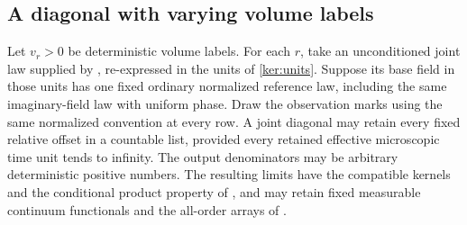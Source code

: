 \subsection{A diagonal with varying volume labels}

\begin{proposition}
\label{ker:normalized-diagonal}
Let \(v_r>0\) be deterministic volume labels. For each \(r\), take an
unconditioned joint law supplied by ,
re-expressed in the units of \eqref{ker:units}. Suppose its base field
in those units has one fixed ordinary normalized reference law,
including the same imaginary-field law with uniform phase. Draw the
observation marks using the same normalized convention at every row.
A joint diagonal may retain every
fixed relative offset in a countable list, provided every retained
effective microscopic time unit tends to infinity.
The output denominators may be arbitrary deterministic positive
numbers. The resulting limits have the compatible kernels and the
conditional product property of , and may
retain fixed measurable continuum functionals and the all-order
arrays of .
\end{proposition}


